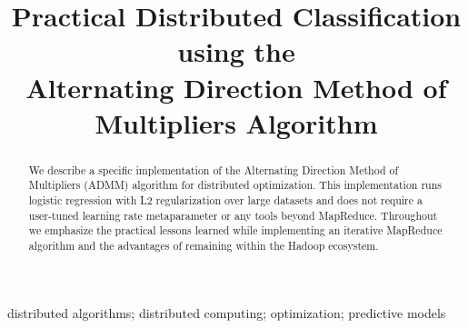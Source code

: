 \documentclass[10pt, conference, compsocconf]{IEEEtran}
\begin{document}
%
\title{\vspace{-2.65em}Practical Distributed Classification using the\\ Alternating Direction Method of Multipliers Algorithm}



\author{
}






\maketitle


\begin{abstract}
We describe a specific implementation of the Alternating Direction Method of Multipliers (ADMM) algorithm for distributed optimization.  This implementation runs logistic regression with L2 regularization over large datasets and does not require a user-tuned learning rate metaparameter or any tools beyond MapReduce.  Throughout we emphasize the practical lessons learned while implementing an iterative MapReduce algorithm and the advantages of remaining within the Hadoop ecosystem.
\end{abstract}

\begin{IEEEkeywords}
distributed algorithms; distributed computing; optimization; predictive models
\end{IEEEkeywords}


%
\IEEEpeerreviewmaketitle
\end{document}
